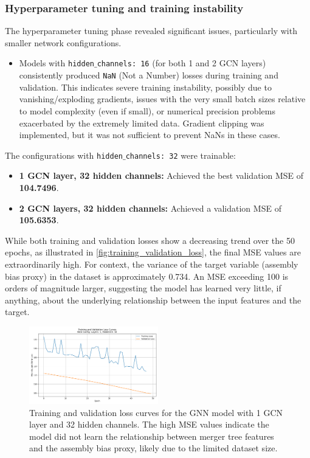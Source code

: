 \documentclass[twocolumn]{aastex631}
\begin{document}
\subsubsection{Hyperparameter tuning and training instability}
The hyperparameter tuning phase revealed significant issues, particularly with smaller network configurations.
\begin{itemize}
    \item Models with \texttt{hidden\ensuremath{\_}channels: 16} (for both 1 and 2 GCN layers) consistently produced \texttt{NaN} (Not a Number) losses during training and validation. This indicates severe training instability, possibly due to vanishing/exploding gradients, issues with the very small batch sizes relative to model complexity (even if small), or numerical precision problems exacerbated by the extremely limited data. Gradient clipping was implemented, but it was not sufficient to prevent NaNs in these cases.
\end{itemize}

The configurations with \texttt{hidden\ensuremath{\_}channels: 32} were trainable:
\begin{itemize}
    \item \textbf{1 GCN layer, 32 hidden channels:} Achieved the best validation MSE of \textbf{104.7496}.
    \item \textbf{2 GCN layers, 32 hidden channels:} Achieved a validation MSE of \textbf{105.6353}.
\end{itemize}

While both training and validation losses show a decreasing trend over the 50 epochs, as illustrated in \autoref{fig:training_validation_loss}, the final MSE values are extraordinarily high. For context, the variance of the target variable (assembly bias proxy) in the dataset is approximately 0.734. An MSE exceeding 100 is orders of magnitude larger, suggesting the model has learned very little, if anything, about the underlying relationship between the input features and the target.

\begin{figure}[htbp]
    \centering
    \includegraphics[width=0.5\textwidth]{../input_files/plots/training_validation_loss_curves_plot_1_1748137938.png}
    \caption{\label{fig:training_validation_loss}Training and validation loss curves for the GNN model with 1 GCN layer and 32 hidden channels. The high MSE values indicate the model did not learn the relationship between merger tree features and the assembly bias proxy, likely due to the limited dataset size.}
\end{figure}
\end{document}
